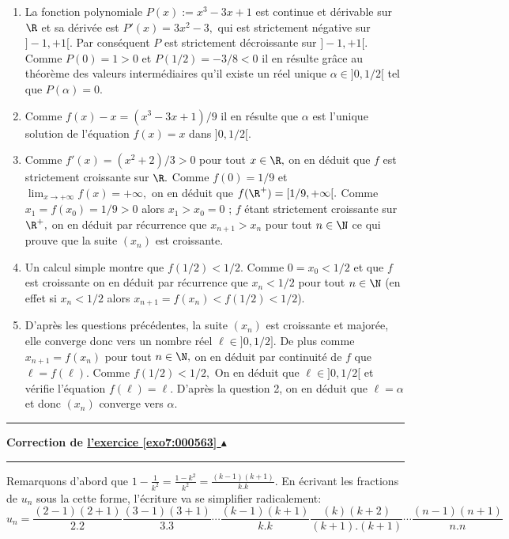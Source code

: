 \documentclass[11pt,a4paper]{article}
\newcounter{exo}
\newcommand{\correction}[1]{\hypertarget{cor7:#1}{}\label{cor7:#1}{\bf Correction de \hyperlink{exo7:#1}{l'exercice \ref{exo7:#1} $\blacktriangle$}}\vspace{1mm}\hrule\vspace{1mm}}
\newcommand{\fincorrection}{\vspace{1mm}\hrule\vspace*{7mm}}
\begin{document}
\begin{enumerate}
\item
 La fonction polynomiale $P (x) := x^{3} - 3 x + 1$ est continue et
d\'erivable sur $\R$ et sa d\'eriv\'ee est $P' (x) = 3 x^{2} - 3,$
qui est strictement n\'egative sur $]- 1 , + 1[.$ Par cons\'equent
$P$ est strictement d\'ecroissante sur $]- 1 , + 1[.$ Comme $P (0)
= 1 > 0$ et $P (1\slash 2) = - 3 \slash 8 < 0$ il en r\'esulte
gr\^ace au th\'eor\`eme des valeurs interm\'ediaires qu'il existe
un r\'eel unique $\alpha \in ]0,1\slash 2[$ tel que $P (\alpha) =
0.$
\item Comme $ f (x) - x = (x^{3} - 3 x + 1) \slash 9$ il en
r\'esulte que $\alpha$ est l'unique solution de l'\'equation $f
(x) = x$ dans $]0,1\slash 2[.$
\item
Comme $f' (x) = (x^{2} +2)\slash 3 > 0$ pour tout $x \in \R,$ on
en d\'eduit que $f$ est strictement croissante sur $\R.$ Comme $f
(0) = 1 \slash 9$ et $\lim_{x \to + \infty} f (x) = + \infty,$ on
en d\'eduit que $ f (\R^{+}) = [1\slash 9 , + \infty[.$ Comme
$x_{1} = f (x_{0}) = 1 \slash 9  >  0$ alors $x_1 > x_0=0$ ;   $f$ étant
strictement croissante sur $\R^{+},$ on en d\'eduit par
r\'ecurrence que $x_{n + 1} > x_{n}$ pour tout $n \in \N$ ce qui
prouve que la suite $(x_{n})$ est croissante.
\item  Un calcul simple montre que  $f (1 \slash 2) < 1
\slash 2.$ Comme $0 = x_{0} < 1 \slash 2$ et que $f$ est
croissante on en d\'eduit par r\'ecurrence que $ x_{n} < 1 \slash
2$ pour tout $n \in \N$ (en effet si $x_n < 1/2$ alors 
$x_{n+1} = f(x_n) < f(1/2) < 1/2$).
\item D'apr\`es les questions
pr\'ec\'edentes, la suite $(x_{n})$  est croissante et major\'ee,
elle converge donc vers un nombre r\'eel $\ell \in ]0, 1 \slash 2].$
De plus comme $x_{n + 1} = f (x_{n})$ pour tout $n \in \N,$ on en
d\'eduit par continuit\'e de $f$ que $\ell  = f (\ell).$ Comme $f
(1 \slash 2) < 1\slash 2,$ On en d\'eduit que $\ell \in ]0, 1
\slash 2[$ et v\'erifie l'\'equation $f (\ell) = \ell.$ D'apr\`es
la question 2, on en d\'eduit que $\ell = \alpha$ et donc $(x_{n})
$ converge vers $\alpha.$
\end{enumerate}
\fincorrection
\correction{000563}
Remarquons d'abord que $1-\frac{1}{k^2} = \frac{1-k^2}{k^2} = \frac{(k-1)(k+1)}{k.k}$.
En \'ecrivant les fractions de $u_n$ sous la cette forme, l'\'ecriture va se simplifier radicalement:
$$u_n = \frac{(2-1)(2+1)}{2.2}\frac{(3-1)(3+1)}{3.3}\cdots \frac{(k-1)(k+1)}{k.k}\frac{(k)(k+2)}{(k+1).(k+1)}\cdots \frac{(n-1)(n+1)}{n.n}$$
\end{document}
